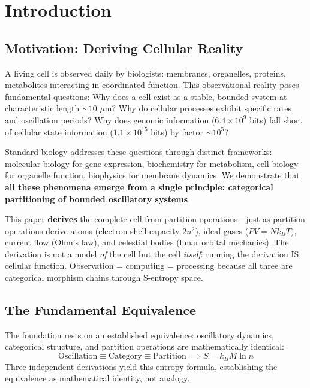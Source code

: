 \documentclass[11pt,a4paper]{article}
\theoremstyle{remark}
\begin{document}
\tableofcontents
\newpage

\section{Introduction}

\subsection{Motivation: Deriving Cellular Reality}

A living cell is observed daily by biologists: membranes, organelles, proteins, metabolites interacting in coordinated function. This observational reality poses fundamental questions: Why does a cell exist as a stable, bounded system at characteristic length $\sim 10$ $\mu$m? Why do cellular processes exhibit specific rates and oscillation periods? Why does genomic information ($6.4 \times 10^9$ bits) fall short of cellular state information ($1.1 \times 10^{15}$ bits) by factor $\sim 10^5$?

Standard biology addresses these questions through distinct frameworks: molecular biology for gene expression, biochemistry for metabolism, cell biology for organelle function, biophysics for membrane dynamics. We demonstrate that \textbf{all these phenomena emerge from a single principle: categorical partitioning of bounded oscillatory systems}.

This paper \textbf{derives} the complete cell from partition operations---just as partition operations derive atoms (electron shell capacity $2n^2$), ideal gases ($PV = Nk_BT$), current flow (Ohm's law), and celestial bodies (lunar orbital mechanics). The derivation is not a model \emph{of} the cell but the cell \emph{itself}: running the derivation IS cellular function. Observation = computing = processing because all three are categorical morphism chains through S-entropy space.

\subsection{The Fundamental Equivalence}

The foundation rests on an established equivalence: oscillatory dynamics, categorical structure, and partition operations are mathematically identical:
\begin{equation}
\text{Oscillation} \equiv \text{Category} \equiv \text{Partition} \implies S = k_B M \ln n
\end{equation}
Three independent derivations yield this entropy formula, establishing the equivalence as mathematical identity, not analogy.
\end{document}

